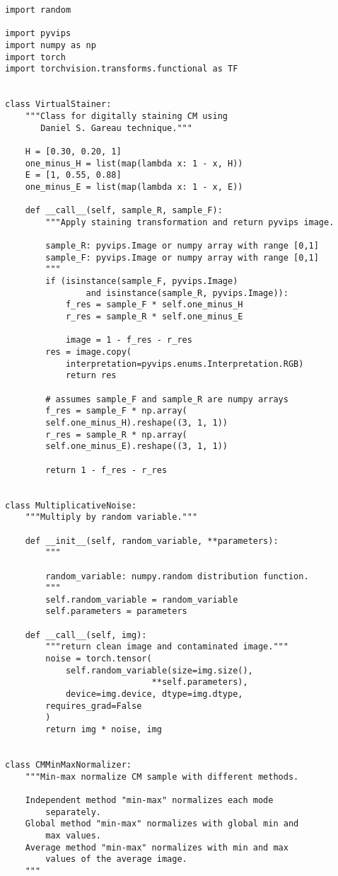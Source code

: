 \documentclass[../main.tex]{subfiles}
\begin{document}
\begin{lstlisting}
import random

import pyvips
import numpy as np
import torch
import torchvision.transforms.functional as TF


class VirtualStainer:
    """Class for digitally staining CM using
       Daniel S. Gareau technique."""

    H = [0.30, 0.20, 1]
    one_minus_H = list(map(lambda x: 1 - x, H))
    E = [1, 0.55, 0.88]
    one_minus_E = list(map(lambda x: 1 - x, E))

    def __call__(self, sample_R, sample_F):
        """Apply staining transformation and return pyvips image.

        sample_R: pyvips.Image or numpy array with range [0,1]
        sample_F: pyvips.Image or numpy array with range [0,1]
        """
        if (isinstance(sample_F, pyvips.Image)
                and isinstance(sample_R, pyvips.Image)):
            f_res = sample_F * self.one_minus_H
            r_res = sample_R * self.one_minus_E

            image = 1 - f_res - r_res
	    res = image.copy(
	    	interpretation=pyvips.enums.Interpretation.RGB)
            return res

        # assumes sample_F and sample_R are numpy arrays
        f_res = sample_F * np.array(
		self.one_minus_H).reshape((3, 1, 1))
        r_res = sample_R * np.array(
		self.one_minus_E).reshape((3, 1, 1))

        return 1 - f_res - r_res


class MultiplicativeNoise:
    """Multiply by random variable."""

    def __init__(self, random_variable, **parameters):
        """

        random_variable: numpy.random distribution function.
        """
        self.random_variable = random_variable
        self.parameters = parameters

    def __call__(self, img):
        """return clean image and contaminated image."""
        noise = torch.tensor(
            self.random_variable(size=img.size(),
	                         **self.parameters),
            device=img.device, dtype=img.dtype,
	    requires_grad=False
        )
        return img * noise, img


class CMMinMaxNormalizer:
    """Min-max normalize CM sample with different methods.

    Independent method "min-max" normalizes each mode
	    separately.
    Global method "min-max" normalizes with global min and
	    max values.
    Average method "min-max" normalizes with min and max
	    values of the average image.
    """


\end{lstlisting}
\end{document}
